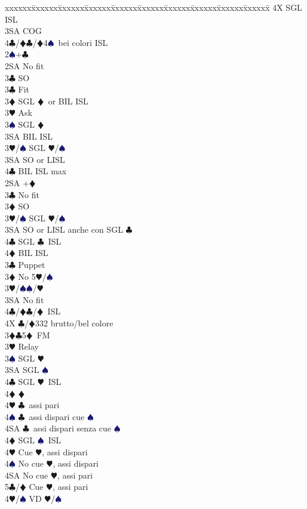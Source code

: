 \documentclass[a4paper,italian]{article}
\newcommand{\BC}{\textcolor{OliveGreen}{$\clubsuit$}}
\newcommand{\BD}{\textcolor{RedOrange}{$\vardiamondsuit$}}
\newcommand{\BH}{\textcolor{Red2}{$\varheartsuit${}}}
\newcommand{\BS}{\textcolor{MidnightBlue}{$\spadesuit${}}}
\newenvironment{bidtable}
{\begin{tabbing}

    xxxxxx\=xxxxxx\=xxxxxx\=xxxxxx\=xxxxxx\=xxxxxx\=xxxxxx\=xxxxxx\=xxxxxx\=xxxxxx\=\kill}
{\end{tabbing} }%
\begin{document}
\begin{multicols}{2}
\begin{bidtable}
        4X \> SGL ISL\-\\
        3SA \> COG\\
        4\BC/\BD {}\BC /\BD 4\BS\ bei colori ISL\-\-\\
        2\BS {}+\BC \+\\
        2SA \> No fit\+\\
        3\BC \> SO\-\\
        3\BC \> Fit\+\\
        3\BD \> SGL \BD\ or BIL ISL\+\\
        3\BH \> Ask\+\\
        3\BS \> SGL \BD \\
        3SA \> BIL ISL\-\-\\
        3\BH/\BS \> SGL \BH /\BS \\
        3SA \> SO or LISL\\
        4\BC \> BIL ISL max\-\-\\
        2SA +\BD \+\\
        3\BC \> No fit\+\\
        3\BD \> SO\\
        3\BH/\BS \> SGL \BH /\BS \\
        3SA \> SO or LISL anche con SGL \BC\\
        4\BC \> SGL \BC\ ISL\\
        4\BD \> BIL ISL\-\-\\
        3\BC \> Puppet\+\\
        3\BD \> No 5\BH /\BS \+\\
        3\BH/\BS {}\BS /\BH \+\\
        3SA \> No fit\+\\
        4\BC/\BD {}\BC /\BD\ ISL\-\-\\
        4X \BC /\BD 332 brutto/bel colore\-\-\\
        3\BD {}\BC 5\BD\ FM\+\\
        3\BH \> Relay\+\\
        3\BS \> SGL \BH \\
        3SA \> SGL \BS \\
        4\BC \> SGL \BH\ ISL\+\\
        4\BD \> \BD \\
        4\BH \> \BC\ assi pari\\
        4\BS \> \BC\ assi dispari cue \BS \\
        4SA \> \BC\ assi dispari senza cue \BS \-\\
        4\BD \> SGL \BS\ ISL\+\\
        4\BH \> Cue \BH, assi dispari\\
        4\BS \> No cue \BH, assi dispari\\
        4SA \> No cue \BH, assi pari\\
        5\BC/\BD \> Cue \BH, assi pari\-\\
        4\BH/\BS \> VD \BH /\BS
    \end{bidtable}
\end{multicols}
\end{document}
